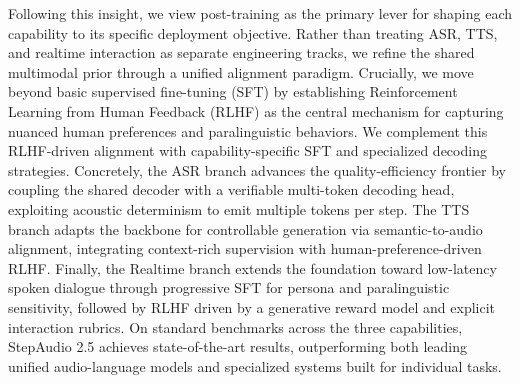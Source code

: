 Following this insight, we view post-training as the primary lever for shaping each capability to its specific deployment objective. Rather than treating ASR, TTS, and realtime interaction as separate engineering tracks, we refine the shared multimodal prior through a unified alignment paradigm. Crucially, we move beyond basic supervised fine-tuning (SFT) by establishing Reinforcement Learning from Human Feedback (RLHF) as the central mechanism for capturing nuanced human preferences and paralinguistic behaviors. We complement this RLHF-driven alignment with capability-specific SFT and specialized decoding strategies. Concretely, the ASR branch advances the quality-efficiency frontier by coupling the shared decoder with a verifiable multi-token decoding head, exploiting acoustic determinism to emit multiple tokens per step. The TTS branch adapts the backbone for controllable generation via semantic-to-audio alignment, integrating context-rich supervision with human-preference-driven RLHF. Finally, the Realtime branch extends the foundation toward low-latency spoken dialogue through progressive SFT for persona and paralinguistic sensitivity, followed by RLHF driven by a generative reward model and explicit interaction rubrics. On standard benchmarks across the three capabilities, StepAudio 2.5 achieves state-of-the-art results, outperforming both leading unified audio-language models and specialized systems built for individual tasks.